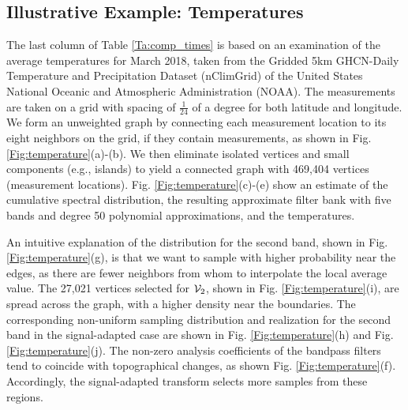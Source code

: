 \documentclass[journal, 10pt]{IEEEtran}
\begin{document}


\subsection{Illustrative Example: Temperatures}

The last column of Table  \ref{Ta:comp_times} is based on an examination of the average temperatures for March 2018, taken from the Gridded 5km GHCN-Daily Temperature and Precipitation Dataset (nClimGrid) \cite{nClimGrid1,nClimGrid2} of the United States National Oceanic and Atmospheric Administration (NOAA). The measurements are taken on a grid with spacing of $\frac{1}{24}$ of a degree for both latitude and longitude. We form an unweighted graph by connecting each measurement location to its eight neighbors on the grid, if they contain measurements, as shown in Fig. \ref{Fig:temperature}(a)-(b). We then eliminate isolated vertices and small components (e.g., islands) to yield a connected graph with 469,404 vertices (measurement locations). Fig. \ref{Fig:temperature}(c)-(e) show an estimate of the cumulative spectral distribution, %
the resulting approximate filter bank with five bands and degree 50 polynomial approximations, and the temperatures. %




An intuitive explanation of the distribution for the second band, %
 shown in Fig. \ref{Fig:temperature}(g), is that we want to sample with higher probability near the edges, as there are fewer neighbors from whom to interpolate the local average value. The 27,021 vertices selected for ${\mathcal{V}}_2$, shown in Fig. \ref{Fig:temperature}(i), are spread across the graph, with a higher density near the boundaries. The corresponding non-uniform sampling distribution and realization for the second band in the signal-adapted case are shown in Fig. \ref{Fig:temperature}(h) and Fig. \ref{Fig:temperature}(j). The non-zero analysis coefficients of the bandpass filters tend to coincide with topographical changes, as shown Fig. \ref{Fig:temperature}(f). Accordingly, the signal-adapted transform selects more samples from these regions.
\end{document}
